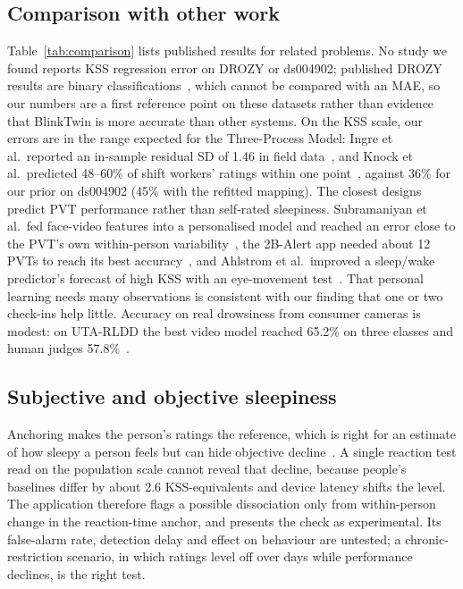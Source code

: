 \subsection{Comparison with other work}
Table~\ref{tab:comparison} lists published results for related problems. No study we found reports KSS regression error on DROZY or ds004902; published DROZY results are binary classifications~\cite{maior2020realtime}, which cannot be compared with an MAE, so our numbers are a first reference point on these datasets rather than evidence that BlinkTwin is more accurate than other systems. On the KSS scale, our errors are in the range expected for the Three-Process Model: Ingre et al.\ reported an in-sample residual SD of 1.46 in field data~\cite{ingre2014validating}, and Knock et al.\ predicted 48--60\% of shift workers' ratings within one point~\cite{knock2021prediction}, against 36\% for our prior on ds004902 (45\% with the refitted mapping). The closest designs predict PVT performance rather than self-rated sleepiness. Subramaniyan et al.\ fed face-video features into a personalised model and reached an error close to the PVT's own within-person variability~\cite{subramaniyan2025personalized}, the 2B-Alert app needed about 12 PVTs to reach its best accuracy~\cite{reifman2019twobalert}, and Ahlstrom et al.\ improved a sleep/wake predictor's forecast of high KSS with an eye-movement test~\cite{ahlstrom2013fit}. That personal learning needs many observations is consistent with our finding that one or two check-ins help little. Accuracy on real drowsiness from consumer cameras is modest: on UTA-RLDD the best video model reached 65.2\% on three classes and human judges 57.8\%~\cite{ghoddoosian2019realistic}.

\subsection{Subjective and objective sleepiness}
Anchoring makes the person's ratings the reference, which is right for an estimate of how sleepy a person feels but can hide objective decline~\cite{vandongen2003cumulative,leproult2003individual}. A single reaction test read on the population scale cannot reveal that decline, because people's baselines differ by about 2.6 KSS-equivalents and device latency shifts the level. The application therefore flags a possible dissociation only from within-person change in the reaction-time anchor, and presents the check as experimental. Its false-alarm rate, detection delay and effect on behaviour are untested; a chronic-restriction scenario, in which ratings level off over days while performance declines, is the right test.

